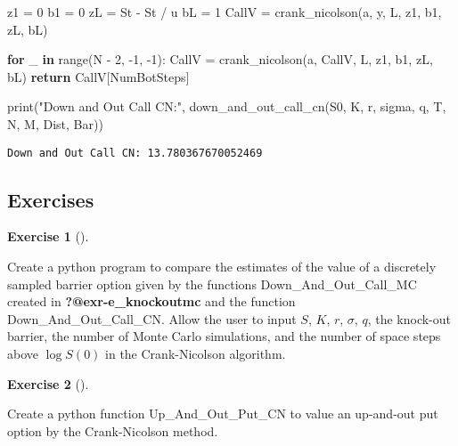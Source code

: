 \documentclass[
  letterpaper,
  DIV=11,
  numbers=noendperiod]{scrartcl}
\newenvironment{Shaded}{\begin{snugshade}}{\end{snugshade}}
\newcommand{\BuiltInTok}[1]{\textcolor[rgb]{0.00,0.23,0.31}{#1}}
\newcommand{\ControlFlowTok}[1]{\textcolor[rgb]{0.00,0.23,0.31}{\textbf{#1}}}
\newcommand{\DecValTok}[1]{\textcolor[rgb]{0.68,0.00,0.00}{#1}}
\newcommand{\KeywordTok}[1]{\textcolor[rgb]{0.00,0.23,0.31}{\textbf{#1}}}
\newcommand{\NormalTok}[1]{\textcolor[rgb]{0.00,0.23,0.31}{#1}}
\newcommand{\OperatorTok}[1]{\textcolor[rgb]{0.37,0.37,0.37}{#1}}
\newcommand{\StringTok}[1]{\textcolor[rgb]{0.13,0.47,0.30}{#1}}
\theoremstyle{definition}
\newtheorem{exercise}{Exercise}[section]
\theoremstyle{remark}
\begin{document}
\begin{Shaded}
\begin{Highlighting}[]
\NormalTok{    z1 }\OperatorTok{=} \DecValTok{0}
\NormalTok{    b1 }\OperatorTok{=} \DecValTok{0}
\NormalTok{    zL }\OperatorTok{=}\NormalTok{ St }\OperatorTok{{-}}\NormalTok{ St }\OperatorTok{/}\NormalTok{ u}
\NormalTok{    bL }\OperatorTok{=} \DecValTok{1}
\NormalTok{    CallV }\OperatorTok{=}\NormalTok{ crank\_nicolson(a, y, L, z1, b1, zL, bL)}

    \ControlFlowTok{for}\NormalTok{ \_ }\KeywordTok{in} \BuiltInTok{range}\NormalTok{(N }\OperatorTok{{-}} \DecValTok{2}\NormalTok{, }\OperatorTok{{-}}\DecValTok{1}\NormalTok{, }\OperatorTok{{-}}\DecValTok{1}\NormalTok{):}
\NormalTok{        CallV }\OperatorTok{=}\NormalTok{ crank\_nicolson(a, CallV, L, z1, b1, zL, bL)}
    \ControlFlowTok{return}\NormalTok{ CallV[NumBotSteps]}

\BuiltInTok{print}\NormalTok{(}\StringTok{"Down and Out Call CN:"}\NormalTok{, down\_and\_out\_call\_cn(S0, K, r, sigma, q, T, N, M, Dist, Bar))}
\end{Highlighting}
\end{Shaded}

\begin{verbatim}
Down and Out Call CN: 13.780367670052469
\end{verbatim}

\subsection{Exercises}\label{exercises}

\begin{exercise}[]\protect\hypertarget{exr-nolabel}{}\label{exr-nolabel}

Create a python program to compare the estimates of the value of a
discretely sampled barrier option given by the functions
Down\_And\_Out\_Call\_MC created in \textbf{?@exr-e\_knockoutmc} and the
function Down\_And\_Out\_Call\_CN. Allow the user to input \(S\), \(K\),
\(r\), \(\sigma\), \(q\), the knock-out barrier, the number of Monte
Carlo simulations, and the number of space steps above \(\log S(0)\) in
the Crank-Nicolson algorithm.

\end{exercise}

\begin{exercise}[]\protect\hypertarget{exr-nolabel}{}\label{exr-nolabel}

Create a python function Up\_And\_Out\_Put\_CN to value an up-and-out
put option by the Crank-Nicolson method.

\end{exercise}
\end{document}
